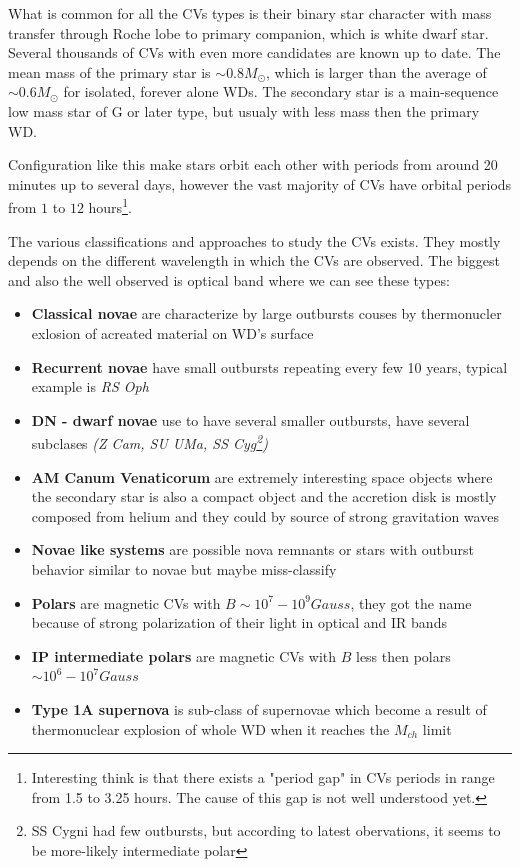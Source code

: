 \documentclass[oneside,a4paper,11pt]{report}
\begin{document}
What is common for all the CVs types is their binary star character with mass transfer through Roche lobe to primary 
companion, which is white dwarf star. Several thousands of CVs with even more candidates are known up to date. 
The mean mass of the primary star is $\sim 0.8 M_\odot$, which is larger than the average of $\sim 0.6 M_\odot$ for isolated, 
forever alone WDs.
The secondary star is a main-sequence low mass star of G or later type, but usualy with less mass then the primary WD.      

Configuration like this make stars orbit each other with periods from around 20 minutes up to several days, 
however the vast majority of CVs have orbital periods from $1$ to $12$ hours\footnote{Interesting think is that there exists a "period gap" 
in CVs periods in range from 1.5 to 3.25 hours. The cause of this gap is not well understood yet. }.

The various classifications and approaches to study the CVs exists. They mostly depends on the different wavelength in which the CVs are 
observed. The biggest and also the well observed is optical band where we can see these types: 
\begin{itemize}
 \item \textbf{Classical novae} are characterize by large outbursts couses by thermonucler exlosion of acreated material on WD's surface
 \item \textbf{Recurrent novae} have small outbursts repeating every few 10 years, typical example is \textit{RS Oph}
 \item \textbf{DN - dwarf novae} use to have several smaller outbursts, have several subclases \textit{(Z Cam, SU UMa, SS Cyg\footnote{SS Cygni had few 
outbursts, but according to latest obervations, it seems to be more-likely intermediate polar})} 
 \item \textbf{AM Canum Venaticorum} are extremely interesting space objects where the secondary star is also a compact object and the accretion 
disk is mostly composed from helium and they could by source of strong gravitation waves 
 \item \textbf{Novae like systems} are possible nova remnants or stars with outburst behavior similar to novae but maybe miss-classify
 \item \textbf{Polars} are magnetic CVs with $B \sim 10^7 - 10^9 Gauss$, they got the name because of strong polarization of their light in optical and IR bands 
 \item \textbf{IP intermediate polars} are magnetic CVs with $B$ less then polars $\sim10^6-10^7 Gauss$ 
 \item \textbf{Type 1A supernova} is sub-class of supernovae which become a result of thermonuclear explosion of whole WD when it reaches the $M_{ch}$ limit  
\end{itemize}
\end{document}
